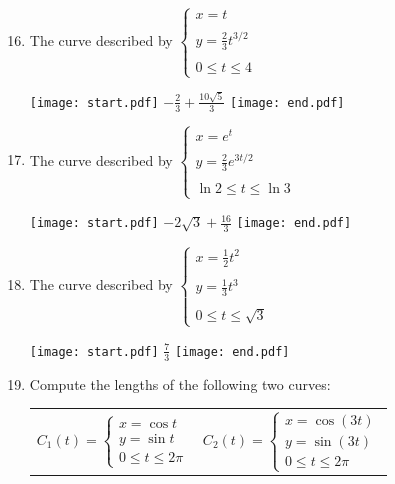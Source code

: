 \documentclass[12pt]{article}
\begin{document}

\begin{enumerate}
\setcounter{enumi}{15}

\item The curve described by $\left\{\begin{array}{l}
x=t\\
\\
y=\frac{2}{3}t^{3/2}\\
\\
0 \leq t \leq 4 \end{array}\right.$

\texttt{[image: start.pdf]}
{{$-\frac{2}{3}+\frac{10\sqrt{5}}{3}$}}
\texttt{[image: end.pdf]}


\item The curve described by $\left\{\begin{array}{l}
x=e^t\\
\\
y=\frac{2}{3}e^{3t/2}\\
\\
\ln{2} \leq t \leq \ln{3} \end{array}\right.$

\texttt{[image: start.pdf]}
{{$-2\sqrt{3}+\frac{16}{3}$}}
\texttt{[image: end.pdf]}


\item The curve described by $\left\{\begin{array}{l}
x=\frac{1}{2}t^2\\
\\
y=\frac{1}{3}t^3\\
\\
0 \leq t \leq \sqrt{3} \end{array} \right.$

\texttt{[image: start.pdf]}
{{$\frac{7}{3}$}}
\texttt{[image: end.pdf]}


\item Compute the lengths of the following two curves:

\begin{center}
\begin{tabular}{cc}
$C_1(t)=\left\{\begin{array}{l}
x=\cos{t}\\
y=\sin{t}\\
0 \leq t \leq 2\pi \end{array} \right.$ \hspace{0.5 cm}& \hspace{0.5 cm}
$C_2(t)=\left\{\begin{array}{l}
x=\cos{(3t)}\\
y=\sin{(3t)}\\
0 \leq t \leq 2\pi \end{array} \right.$
\end{tabular}
\end{center}


\end{enumerate}
\end{document}
